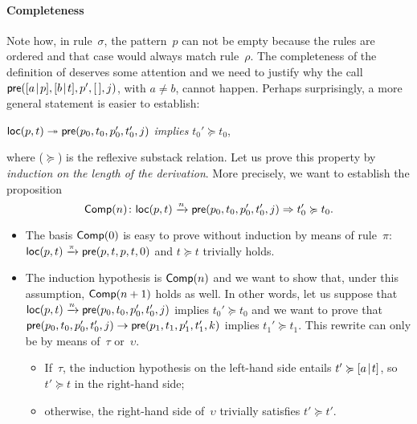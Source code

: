\paragraph{Completeness}

Note how, in rule~\(\sigma\), the pattern~\(p\) can not be empty
because the rules are ordered and that case would always match
rule~\(\rho\). The completeness of the definition of 
deserves some attention and we need to justify why the call
\(\textsf{pre}([{a}\!\mid\!{p}],[{b}\!\mid\!{t}],p',[\,],j)\), with \(a \neq b\),
cannot happen. Perhaps surprisingly, a more general statement is
easier to establish:
\begin{center}
\(\textsf{loc}(p,t) \twoheadrightarrow \textsf{pre}(p_0,t_0,p_0',t_0',j)\)
\textsl{implies} \(t_0' \succcurlyeq t_0\),
\end{center}
where (\(\succcurlyeq\)) is the reflexive substack relation. Let us
prove this property by \emph{induction on the length of the
  derivation}. More precisely, we want to establish the proposition
\begin{equation*}
\pred{Comp}{n} \colon \fun{loc}(p,t) \xrightarrow{\smash{n}}
\fun{pre}(p_0,t_0,p_0',t_0',j) \Rightarrow t_0' \succcurlyeq t_0.
\index{Comp@\predName{Comp}}
\end{equation*}
\begin{itemize}

  \item The basis \(\textsf{Comp}({0})\) is easy to prove without
    induction by means of rule~\(\pi\): \(\textsf{loc}(p,t)
    \xrightarrow{\smash{\pi}} \textsf{pre}(p,t,p,t,0)\) and \(t
    \succcurlyeq t\) trivially holds.

    \item The induction hypothesis is \(\textsf{Comp}({n})\) and we want
      to show that, under this assumption, \(\textsf{Comp}({n+1})\) holds
      as well. In other words, let us suppose that \(\textsf{loc}(p,t)
      \xrightarrow{\smash{n}} \textsf{pre}(p_0,t_0,p_0',t_0',j)\) implies
      \(t_0' \succcurlyeq t_0\) and we want to prove that
      \(\textsf{pre}(p_0,t_0,p_0',t_0',j) \rightarrow
      \textsf{pre}(p_1,t_1,p_1',t_1',k)\) implies \(t_1' \succcurlyeq
      t_1\). This rewrite can only be by means of~\(\tau\)
      or~\(\upsilon\). 
      \begin{itemize}

      \item If~\(\tau\), the induction hypothesis on the
        left\hyp{}hand side entails \(t' \succcurlyeq [{a}\!\mid\!{t}]\),
        so \(t' \succcurlyeq t\) in the right\hyp{}hand side;

      \item otherwise, the right\hyp{}hand side of~\(\upsilon\)
        trivially satisfies \(t' \succcurlyeq t'\).

      \end{itemize}
\end{itemize}
